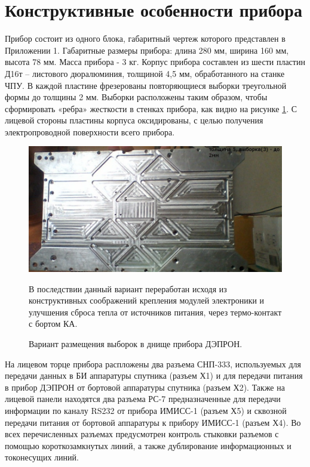 \section{Конструктивные особенности прибора}

Прибор состоит из одного блока, габаритный чертеж которого представлен в Приложении 1. Габаритные размеры прибора: длина  280 мм, ширина 160 мм, высота 78 мм. Масса прибора - 3 кг. Корпус прибора составлен из шести пластин Д16т -- листового дюралюминия, толщиной 4,5 мм, обработанного на станке ЧПУ. В каждой пластине фрезерованы повторяющиеся выборки треугольной формы до толщины 2 мм. Выборки расположены таким образом, чтобы сформировать «ребра» жесткости в стенках прибора, как видно на рисунке \ref{fig:viborki}. С лицевой стороны пластины корпуса оксидированы, с целью получения электропроводной поверхности всего прибора.

\begin{figure}
\centering
\includegraphics[width=0.7\linewidth]{images/viborki1}
\caption{ Вариант размещения выборок в днище прибора ДЭПРОН.}
\medskip
{\small В последствии данный вариант переработан исходя из конструктивных соображений крепления модулей электроники и улучшения сброса тепла от источников питания, через термо-контакт с бортом КА. }
\label{fig:viborki}
\end{figure}


На лицевом торце прибора распложены два разъема СНП-333, используемых для передачи данных в БИ аппаратуры спутника (разъем Х1) и для передачи питания в прибор ДЭПРОН от бортовой аппаратуры спутника (разъем Х2). Также на лицевой панели находятся два разъема РС-7 предназначенные для передачи информации по каналу RS232 от прибора ИМИСС-1 (разъем Х5) и сквозной передачи питания от бортовой аппаратуры к прибору ИМИСС-1 (разъем Х4). Во всех перечисленных разъемах предусмотрен контроль стыковки разъемов с помощью короткозамкнутых линий, а также дублирование информационных и токонесущих линий.


